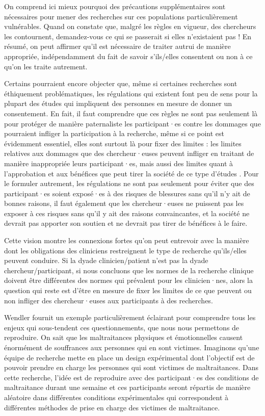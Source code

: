 \documentclass[
  12pt,
]{book}
\begin{document}
On comprend ici mieux pourquoi des précautions supplémentaires sont nécessaires pour mener des recherches sur ces populations particulièrement vulnérables. Quand on constate que, malgré les règles en vigueur, des chercheurs les contournent, demandez-vous ce qui se passerait si elles n'existaient pas ! En résumé, on peut affirmer qu'il est nécessaire de traiter autrui de manière appropriée, indépendamment du fait de savoir s'ils/elles consentent ou non à ce qu'on les traite autrement.

Certains pourraient encore objecter que, même si certaines recherches sont éthiquement problématiques, les régulations qui existent font peu de sens pour la plupart des études qui impliquent des personnes en mesure de donner un consentement. En fait, il faut comprendre que ces règles ne sont pas seulement là pour protéger de manière paternaliste les participant·es contre les dommages que pourraient infliger la participation à la recherche, même si ce point est évidemment essentiel, elles sont surtout là pour fixer des limites : les limites relatives aux dommages que des chercheur·euses peuvent infliger en traitant de manière inappropriée leurs participant·es, mais aussi des limites quant à l'approbation et aux bénéfices que peut tirer la société de ce type d'études \citep{sep-clinical-research}. Pour le formuler autrement, les régulations ne sont pas seulement pour éviter que des participant·es soient exposé·es à des risques de blessures sans qu'il n'y ait de bonnes raisons, il faut également que les chercheur·euses ne puissent pas les exposer à ces risques sans qu'il y ait des raisons convaincantes, et la société ne devrait pas apporter son soutien et ne devrait pas tirer de bénéfices à le faire.

Cette vision montre les connexions fortes qu'on peut entrevoir avec la manière dont les obligations des cliniciens restreignent le type de recherche qu'ils/elles peuvent conduire. Si la dyade clinicien/patient n'est pas la dyade chercheur/participant, si nous concluons que les normes de la recherche clinique doivent être différentes des normes qui prévalent pour les clinicien·nes, alors la question qui reste est d'être en mesure de fixer les limites de ce que peuvent ou non infliger des chercheur·euses aux participants à des recherches.

Wendler \citeyearpar{sep-clinical-research} fournit un exemple particulièrement éclairant pour comprendre tous les enjeux qui sous-tendent ces questionnements, que nous nous permettons de reproduire. On sait que les maltraitances physiques et émotionnelles causent énormément de souffrances aux personnes qui en sont victimes. Imaginons qu'une équipe de recherche mette en place un design expérimental dont l'objectif est de pouvoir prendre en charge les personnes qui sont victimes de maltraitances. Dans cette recherche, l'idée est de reproduire avec des participant·es des conditions de maltraitance durant une semaine et ces participants seront répartis de manière aléatoire dans différentes conditions expérimentales qui correspondent à différentes méthodes de prise en charge des victimes de maltraitance.
\end{document}
